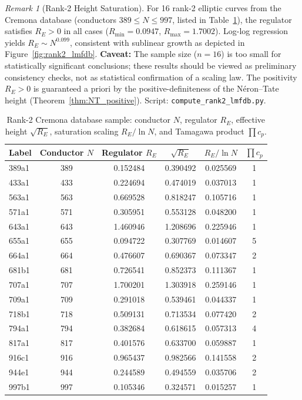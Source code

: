 \documentclass[aps,prd,twocolumn,superscriptaddress,nofootinbib,floatfix]{revtex4-2}
\theoremstyle{definition}
\theoremstyle{remark}
\newtheorem{remark}[theorem]{Remark}
\begin{document}
\begin{remark}[Rank-2 Height Saturation]
\label{rem:rank2-saturation}
For 16 rank-2 elliptic curves from the Cremona database (conductors $389 \leq N \leq 997$, listed in Table~\ref{tab:rank2_cremona_dataset}), the regulator satisfies $R_E > 0$ in all cases ($R_{\min} = 0.0947$, $R_{\max} = 1.7002$). Log-log regression yields $R_E \sim N^{0.099}$, consistent with sublinear growth as depicted in Figure~\ref{fig:rank2_lmfdb}. \textbf{Caveat:} The sample size ($n = 16$) is too small for statistically significant conclusions; these results should be viewed as preliminary consistency checks, not as statistical confirmation of a scaling law. The positivity $R_E > 0$ is guaranteed a priori by the positive-definiteness of the Néron--Tate height (Theorem~\ref{thm:NT_positive}). Script: \texttt{compute\_rank2\_lmfdb.py}.
\end{remark}

\begin{table}[t]
\centering
\caption{Rank-2 Cremona database sample: conductor $N$, regulator $R_E$, effective height $\sqrt{R_E}$, saturation scaling $R_E/\ln N$, and Tamagawa product $\prod c_p$.}
\label{tab:rank2_cremona_dataset}
\begin{tabular*}{\textwidth}{@{\extracolsep{\fill}}lccccc@{}}
\toprule
\textbf{Label} & \textbf{Conductor $N$} & \textbf{Regulator $R_E$} & $\sqrt{R_E}$ & $R_E/\ln N$ & $\prod c_p$ \\
\midrule
389a1 & 389 & 0.152484 & 0.390492 & 0.025569 & 1 \\
433a1 & 433 & 0.224694 & 0.474019 & 0.037013 & 1 \\
563a1 & 563 & 0.669528 & 0.818247 & 0.105716 & 1 \\
571a1 & 571 & 0.305951 & 0.553128 & 0.048200 & 1 \\
\addlinespace
643a1 & 643 & 1.460946 & 1.208696 & 0.225946 & 1 \\
655a1 & 655 & 0.094722 & 0.307769 & 0.014607 & 5 \\
664a1 & 664 & 0.476607 & 0.690367 & 0.073347 & 2 \\
681b1 & 681 & 0.726541 & 0.852373 & 0.111367 & 1 \\
\addlinespace
707a1 & 707 & 1.700201 & 1.303918 & 0.259146 & 1 \\
709a1 & 709 & 0.291018 & 0.539461 & 0.044337 & 1 \\
718b1 & 718 & 0.509131 & 0.713534 & 0.077420 & 2 \\
794a1 & 794 & 0.382684 & 0.618615 & 0.057313 & 4 \\
\addlinespace
817a1 & 817 & 0.401576 & 0.633700 & 0.059887 & 1 \\
916c1 & 916 & 0.965437 & 0.982566 & 0.141558 & 2 \\
944e1 & 944 & 0.244589 & 0.494559 & 0.035706 & 2 \\
997b1 & 997 & 0.105346 & 0.324571 & 0.015257 & 1 \\
\bottomrule
\end{tabular*}
\end{table}
\end{document}
